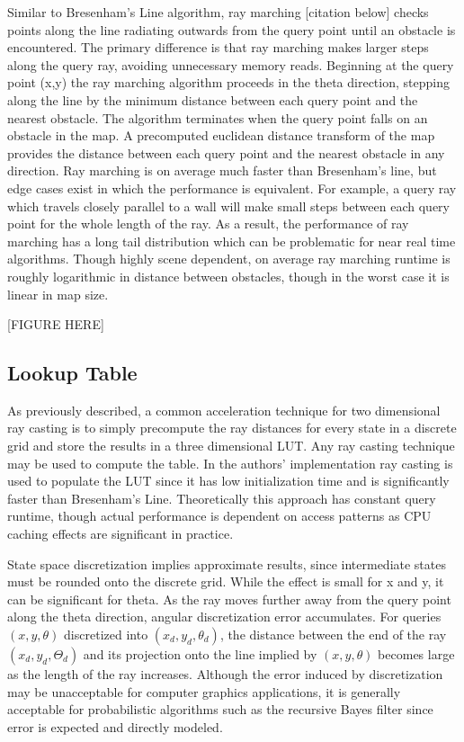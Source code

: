 \documentclass[letterpaper, 10 pt, conference]{ieeeconf}  %
\begin{document}
Similar to Bresenham’s Line algorithm, ray marching [citation below] checks points along the line radiating outwards from the query point until an obstacle is encountered. The primary difference is that ray marching makes larger steps along the query ray, avoiding unnecessary memory reads. Beginning at the query point (x,y) the ray marching algorithm proceeds in the theta direction, stepping along the line by the minimum distance between each query point and the nearest obstacle. The algorithm terminates when the query point falls on an obstacle in the map. A precomputed euclidean distance transform of the map provides the distance between each query point and the nearest obstacle in any direction.
Ray marching is on average much faster than Bresenham’s line, but edge cases exist in which the performance is equivalent. For example, a query ray which travels closely parallel to a wall will make small steps between each query point for the whole length of the ray. As a result, the performance of ray marching has a long tail distribution which can be problematic for near real time algorithms. Though highly scene dependent, on average ray marching runtime is roughly logarithmic in distance between obstacles, though in the worst case it is linear in map size.

[FIGURE HERE]

\subsection{Lookup Table}

As previously described, a common acceleration technique for two dimensional ray casting is to simply precompute the ray distances for every state in a discrete grid and store the results in a three dimensional LUT. Any ray casting technique may be used to compute the table. In the authors’ implementation ray casting is used to populate the LUT since it has low initialization time and is significantly faster than Bresenham’s Line. Theoretically this approach has constant query runtime, though actual performance is dependent on access patterns as CPU caching effects are significant in practice.

State space discretization implies approximate results, since intermediate states must be rounded onto the discrete grid. While the effect is small for x and y, it can be significant for theta. As the ray moves further away from the query point along the theta direction, angular discretization error accumulates. For queries $(x,y,\theta)$ discretized into $(x_d,y_d,\theta_d)$, the distance between the end of the ray $(x_d,y_d,Θ_d)$ and its projection onto the line implied by $(x,y,\theta)$ becomes large as the length of the ray increases. Although the error induced by discretization may be unacceptable for computer graphics applications, it is generally acceptable for probabilistic algorithms such as the recursive Bayes filter since error is expected and directly modeled. 
\end{document}
